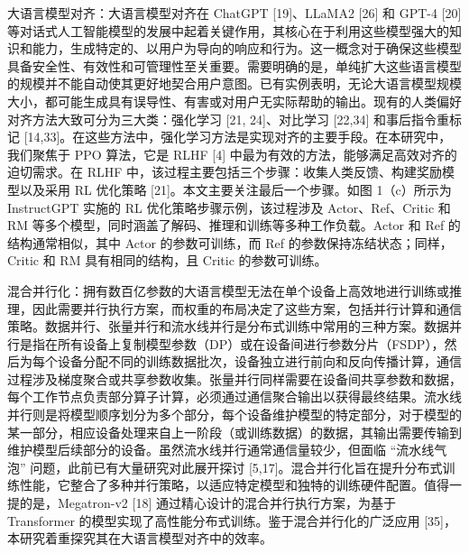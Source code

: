 大语言模型对齐：大语言模型对齐在 ChatGPT [19]、LLaMA2 [26] 和 GPT-4 [20] 等对话式人工智能模型的发展中起着关键作用，其核心在于利用这些模型强大的知识和能力，生成特定的、以用户为导向的响应和行为。这一概念对于确保这些模型具备安全性、有效性和可管理性至关重要。需要明确的是，单纯扩大这些语言模型的规模并不能自动使其更好地契合用户意图。已有实例表明，无论大语言模型规模大小，都可能生成具有误导性、有害或对用户无实际帮助的输出。现有的人类偏好对齐方法大致可分为三大类：强化学习 [21, 24]、对比学习 [22,34] 和事后指令重标记 [14,33]。在这些方法中，强化学习方法是实现对齐的主要手段。在本研究中，我们聚焦于 PPO 算法，它是 RLHF [4] 中最为有效的方法，能够满足高效对齐的迫切需求。在 RLHF 中，该过程主要包括三个步骤：收集人类反馈、构建奖励模型以及采用 RL 优化策略 [21]。本文主要关注最后一个步骤。如图 1（c）所示为 InstructGPT 实施的 RL 优化策略步骤示例，该过程涉及 Actor、Ref、Critic 和 RM 等多个模型，同时涵盖了解码、推理和训练等多种工作负载。Actor 和 Ref 的结构通常相似，其中 Actor 的参数可训练，而 Ref 的参数保持冻结状态；同样，Critic 和 RM 具有相同的结构，且 Critic 的参数可训练。 

混合并行化：拥有数百亿参数的大语言模型无法在单个设备上高效地进行训练或推理，因此需要并行执行方案，而权重的布局决定了这些方案，包括并行计算和通信策略。数据并行、张量并行和流水线并行是分布式训练中常用的三种方案。数据并行是指在所有设备上复制模型参数（DP）或在设备间进行参数分片（FSDP），然后为每个设备分配不同的训练数据批次，设备独立进行前向和反向传播计算，通信过程涉及梯度聚合或共享参数收集。张量并行同样需要在设备间共享参数和数据，每个工作节点负责部分算子计算，必须通过通信聚合输出以获得最终结果。流水线并行则是将模型顺序划分为多个部分，每个设备维护模型的特定部分，对于模型的某一部分，相应设备处理来自上一阶段（或训练数据）的数据，其输出需要传输到维护模型后续部分的设备。虽然流水线并行通常通信量较少，但面临 “流水线气泡” 问题，此前已有大量研究对此展开探讨 [5,17]。混合并行化旨在提升分布式训练性能，它整合了多种并行策略，以适应特定模型和独特的训练硬件配置。值得一提的是，Megatron-v2 [18] 通过精心设计的混合并行执行方案，为基于 Transformer 的模型实现了高性能分布式训练。鉴于混合并行化的广泛应用 [35]，本研究着重探究其在大语言模型对齐中的效率。 

